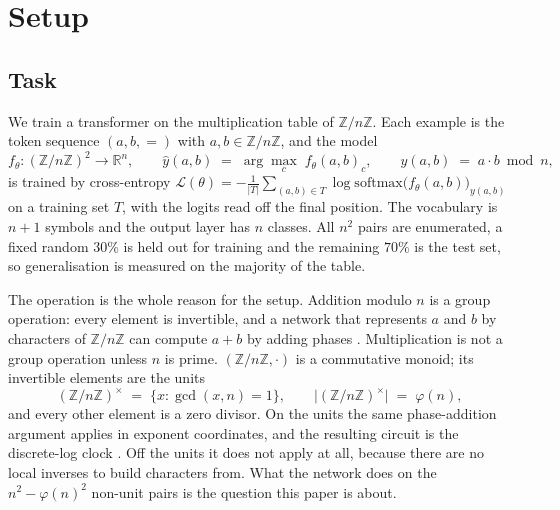 \section{Setup}
\label{sec:setup}

\subsection{Task}
\label{sec:setup-task}

We train a transformer on the multiplication table of $\mathbb{Z}/n\mathbb{Z}$. Each example
is the token sequence $(a, b, {=})$ with $a, b \in \mathbb{Z}/n\mathbb{Z}$, and the model
\begin{equation}
  \label{eq:task}
  f_{\theta} : (\mathbb{Z}/n\mathbb{Z})^{2} \longrightarrow \mathbb{R}^{n},
  \qquad
  \hat{y}(a,b) \;=\; \arg\max_{c} \; f_{\theta}(a,b)_{c},
  \qquad
  y(a,b) \;=\; a \cdot b \bmod n ,
\end{equation}
is trained by cross-entropy $\mathcal{L}(\theta) = -\frac{1}{|T|}\sum_{(a,b) \in T}
\log \mathrm{softmax}\bigl(f_{\theta}(a,b)\bigr)_{y(a,b)}$ on a training set $T$, with the
logits read off the final position. The vocabulary is $n+1$ symbols and the
output layer has $n$ classes. All $n^{2}$ pairs are enumerated, a fixed random $30\%$ is held
out for training and the remaining $70\%$ is the test set, so generalisation is measured on
the majority of the table.

The operation is the whole reason for the setup. Addition modulo $n$ is a group operation:
every element is invertible, and a network that represents $a$ and $b$ by characters of
$\mathbb{Z}/n\mathbb{Z}$ can compute $a+b$ by adding phases
\citep{nanda2023progress}. Multiplication is not a group operation unless $n$ is prime.
$(\mathbb{Z}/n\mathbb{Z}, \cdot)$ is a commutative monoid; its invertible elements are the
units
\begin{equation}
  \label{eq:units}
  (\mathbb{Z}/n\mathbb{Z})^{\times} \;=\; \{x : \gcd(x, n) = 1\},
  \qquad
  \bigl| (\mathbb{Z}/n\mathbb{Z})^{\times} \bigr| \;=\; \varphi(n),
\end{equation}
and every other element is a zero divisor. On the units
the same phase-addition argument applies in exponent coordinates, and the resulting circuit is
the discrete-log clock \citep{nguyen2026dlogclock}. Off the units it does not apply at all,
because there are no local inverses to build characters from. What the network does on the
$n^{2} - \varphi(n)^{2}$ non-unit pairs is the question this paper is about.

